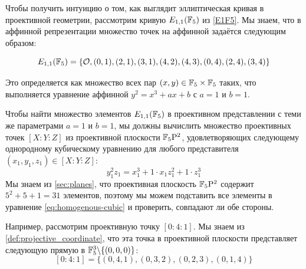 \begin{example}
\label{ex:E1F5-projective}
 Чтобы получить интуицию о том, как выглядит эллиптическая кривая в проективной геометрии, рассмотрим кривую $E_{1,1}(\mathbb{F}_5)$ из \examplename{} \ref{E1F5}. Мы знаем, что в аффинной репрезентации множество точек на аффинной  задаётся следующим образом:

\begin{equation}\label{eq:E1F5-affine}
E_{1,1}(\mathbb{F}_5) = \{\mathcal{O}, (0,1),(2,1),(3,1),(4,2),(4,3),(0,4),(2,4),(3,4)\}
\end{equation}

Это определяется как множество всех пар $(x,y)\in \mathbb{F}_5\times \mathbb{F}_5$ таких, что выполняется уравнение аффинной  $y^2 = x^3 + ax +b$ с $a=1$ и $b=1$.

Чтобы найти множество элементов $E_{1,1}(\mathbb{F}_5)$ в проективном представлении  с теми же параметрами $a=1$ и $b=1$, мы должны вычислить множество проективных точек $[X:Y:Z]$ из проективной плоскости $\mathbb{F}_5\mathrm{P}^2$, удовлетворяющих следующему однородному кубическому уравнению для любого представителя $(x_1,y_1,z_1)\in [X:Y:Z]$:
\begin{equation}\label{eq:homogenous-cubic}
y_1^2z_1 = x_1^3 + 1\cdot x_1 z_1^2 + 1\cdot z_1^3
\end{equation}
Мы знаем из \secname{} \ref{sec:planes}, что проективная плоскость $\mathbb{F}_5\mathrm{P}^2$ содержит $5^2+5+1= 31$ элементов, поэтому мы можем подставить все элементы в уравнение \eqref{eq:homogenous-cubic} и проверить, совпадают ли обе стороны.

Например, рассмотрим проективную точку $[0:4:1]$. Мы знаем из \eqref{def:projective_coordinate}, что эта точка в проективной плоскости представляет следующую прямую в $\mathbb{F}_5^3\backslash\{(0,0,0)\}$:
\begin{equation}
\label{ex:projective_coordinate_1}
[0:4:1] = \{(0,4,1),(0,3,2),(0,2,3),(0,1,4)\}
\end{equation} 


\end{example}
